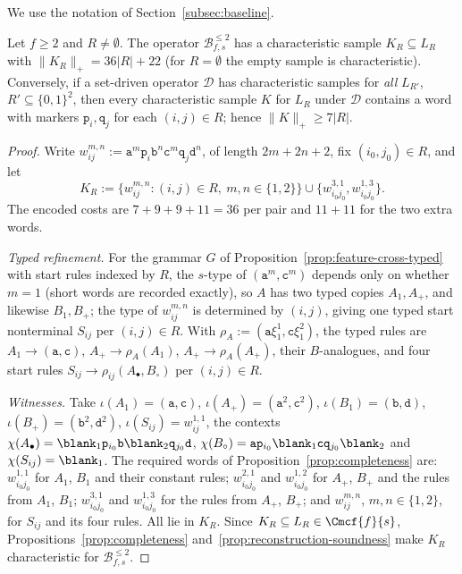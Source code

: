 We use the notation of Section~\ref{subsec:baseline}.

\begin{proposition}
\label{prop:feature-family-witness-budget}
Let $f\ge2$ and $R\ne\emptyset$.  The operator $\mathcal B^{\le2}_{f,s}$ has a
characteristic sample $K_R\subseteq L_R$ with $\|K_R\|_+=36|R|+22$ (for
$R=\emptyset$ the empty sample is characteristic).  Conversely, if a set-driven
operator $\mathcal D$ has characteristic samples for \emph{all} $L_{R'}$,
$R'\subseteq\{0,1\}^2$, then every characteristic sample $K$ for $L_R$ under
$\mathcal D$ contains a word with markers $\mathtt p_i,\mathtt q_j$ for each
$(i,j)\in R$; hence $\|K\|_+\ge7|R|$.
\end{proposition}

\begin{proof}
Write $w^{m,n}_{ij}:=\mathtt a^m\mathtt p_i\mathtt b^n\mathtt c^m\mathtt q_j\mathtt d^n$,
of length $2m+2n+2$, fix $(i_0,j_0)\in R$, and let
\[
 K_R:=\{w^{m,n}_{ij}:(i,j)\in R,\ m,n\in\{1,2\}\}\cup
 \{w^{3,1}_{i_0j_0},w^{1,3}_{i_0j_0}\}.
\]
The encoded costs are $7+9+9+11=36$ per pair and $11+11$ for the two extra words.

\emph{Typed refinement.}  For the grammar $G$ of
Proposition~\ref{prop:feature-cross-typed} with start rules indexed by $R$, the
$s$-type of $(\mathtt a^m,\mathtt c^m)$ depends only on whether $m=1$ (short words
are recorded exactly), so $A$ has two typed copies $A_1,A_+$, and likewise $B_1,B_+$;
the type of $w^{m,n}_{ij}$ is determined by $(i,j)$, giving one typed start
nonterminal $S_{ij}$ per $(i,j)\in R$.  With $\rho_A:=(\mathtt a\xi_1^1,\mathtt c\xi_1^2)$, the typed rules are
$A_1\to(\mathtt a,\mathtt c)$, $A_+\to\rho_A(A_1)$, $A_+\to\rho_A(A_+)$,
their $B$-analogues, and four start rules $S_{ij}\to\rho_{ij}(A_\bullet,B_\circ)$ per
$(i,j)\in R$.

\emph{Witnesses.}  Take $\iota(A_1)=(\mathtt a,\mathtt c)$,
$\iota(A_+)=(\mathtt a^2,\mathtt c^2)$, $\iota(B_1)=(\mathtt b,\mathtt d)$,
$\iota(B_+)=(\mathtt b^2,\mathtt d^2)$, $\iota(S_{ij})=w^{1,1}_{ij}$, the contexts
$\chi(A_\bullet)=\blank_1\mathtt p_{i_0}\mathtt b\blank_2\mathtt q_{j_0}\mathtt d$,
$\chi(B_\circ)=\mathtt a\mathtt p_{i_0}\blank_1\mathtt c\mathtt q_{j_0}\blank_2$ and
$\chi(S_{ij})=\blank_1$.  The required words of
Proposition~\ref{prop:completeness} are: $w^{1,1}_{i_0j_0}$ for $A_1$, $B_1$ and their
constant rules; $w^{2,1}_{i_0j_0}$ and $w^{1,2}_{i_0j_0}$ for $A_+$, $B_+$ and the rules
from $A_1$, $B_1$; $w^{3,1}_{i_0j_0}$ and $w^{1,3}_{i_0j_0}$ for the rules from $A_+$,
$B_+$; and $w^{m,n}_{ij}$, $m,n\in\{1,2\}$, for $S_{ij}$ and its four rules.  All lie in
$K_R$.  Since $K_R\subseteq L_R\in\Cmcf{f}{s}$, Propositions~\ref{prop:completeness}
and~\ref{prop:reconstruction-soundness} make $K_R$ characteristic for
$\mathcal B^{\le2}_{f,s}$.


\end{proof}
